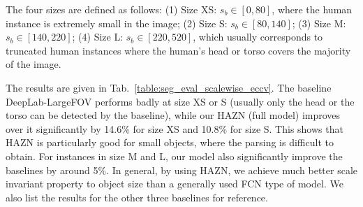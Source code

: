 The four sizes are defined as follows: (1) Size XS: $s_b \in [0,80]$, where the human instance is extremely small in the image;
(2) Size S: $s_b \in [80,140]$; (3) Size M: $s_b \in [140,220]$; (4) Size L: $s_b \in [220,520]$,
which usually corresponds to truncated human instances where the human's head or torso covers the majority of the image.

The results are given in Tab.~\ref{table:seg_eval_scalewise_eccv}.
The baseline DeepLab-LargeFOV performs badly at size XS or S (usually only the head or the torso can be detected by the baseline),
while our HAZN (full model) improves over it significantly by 14.6\% for size XS and 10.8\% for size S.
This shows that HAZN is particularly good for small objects, where the parsing is difficult to obtain.
For instances in size M and L, our model also significantly improve the baselines by around 5\%.
In general, by using HAZN, we achieve much better scale invariant property to object size than a generally used FCN type of model.
We also list the results for the other three baselines for reference. 

\begin{table}[!tb]
  \centering
  \setlength{\tabcolsep}{10pt}
 \caption{Part segmentation accuracy w.r.t. size of human instance (\%) on PASCAL-Person-Part in terms of mean IOU.}
 \label{table:seg_eval_scalewise_eccv}
\end{table}

